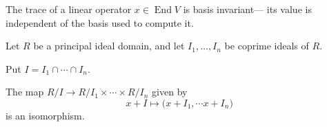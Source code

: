 \documentclass{article}
\DeclareMathOperator{\End}{End}
\begin{document}
\begin{theorem}\label{thm:TraceIsBasisIndependent}
    The trace of a linear operator $x \in \End V$ is basis invariant--- its value is independent of the basis used to compute it.
\end{theorem}

\begin{theorem}
    Let $R$ be a principal ideal domain, and let $I_1, \ldots, I_n$ be coprime ideals of $R$.

    Put $I = I_1 \cap \cdots \cap I_n$.

    The map $R/I \to R/I_1 \times \cdots \times R/I_n$ given by
    \[
        x + I
        \mapsto
        \Big(
            x + I_1,
            \cdots
            x + I_n
        \Big)
    \]
    is an isomorphism.
\end{theorem}
\end{document}

